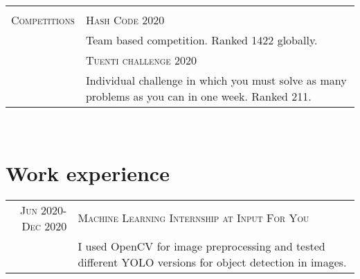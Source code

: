 \documentclass[a4paper,11pt]{article} %
\begin{document}
\begin{tabular}{p{3cm}|p{11cm}}
  \multicolumn{2}{c}{}                                                                                                                                                                                                                                                                \\
  \textsc{Competitions}                  & \textsc{Hash Code 2020}                                                                                                                                                                                                                    \\
                                         & \footnotesize Team based competition. Ranked 1422 globally.                                                                                                                                                                             \\
                                         & \textsc{Tuenti challenge 2020}                                                                                                                                                                                                             \\
                                         & \footnotesize Individual challenge in which you must solve as many problems as you can in one week. Ranked 211.
\end{tabular}\\


\section{Work experience}

\begin{tabular}{r|p{11cm}}	
  \textsc{Jun 2020-Dec 2020}  & \textsc{Machine Learning Internship at Input For You} \\
  & \footnotesize I used OpenCV for image preprocessing and tested different YOLO versions for object detection in images.
\end{tabular}\\



\end{document}
